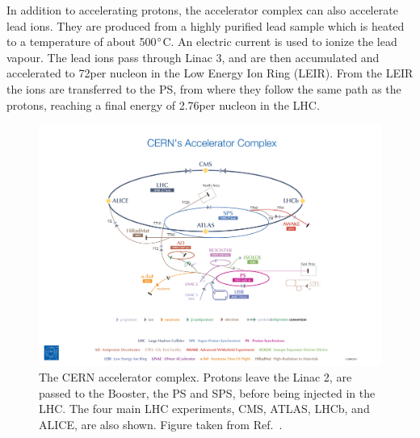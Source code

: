 In addition to accelerating protons, the accelerator complex can also accelerate lead ions.
They are produced from a highly purified lead sample which is heated to a temperature of about
500$^\circ$C. An electric current is used to ionize the lead vapour.
The lead ions pass through Linac 3, and are then accumulated and accelerated to 72\MeV per nucleon
in the Low Energy Ion Ring (LEIR). 
From the LEIR the ions are transferred to the PS, from where they follow the same path as the
protons, reaching a final energy of 2.76\TeV per nucleon in the LHC. 

\begin{figure}[t]
  \centering
  \includegraphics[width=\textwidth,clip=true,trim=10cm 0 13cm 9cm]
  {figures/lhc/cern_accelerator_complex_cds1621583}
  \caption{The CERN accelerator complex. Protons leave the Linac 2, are passed to the Booster, the
PS and SPS, before being injected in the LHC. The four main LHC experiments, CMS, ATLAS, LHCb, and
ALICE, are also shown. Figure taken from Ref.~\cite{lhc_complex}.
  \label{fig:lhc_complex}}
\end{figure}


